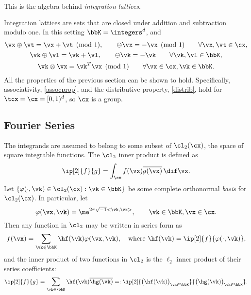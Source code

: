 \documentclass[]{elsarticle}
\theoremstyle{definition}
\theoremstyle{remark}
\begin{document}
This is the algebra behind \emph{integration lattices}.

Integration lattices are sets that are closed under addition and subtraction modulo one.  In this setting $\bbK=\integers^d$, and
\begin{gather*}
\vx \oplus \vt = \vx + \vt \pmod 1, \qquad \ominus \vx = -\vx \pmod 1 \qquad \forall \vx, \vt \in \cx, \\
\vk \oplus \vl = \vk + \vl, \qquad \ominus \vk = -\vk \qquad \forall \vk, \vl \in \bbK, \\
\vk \otimes \vx = \vk^T \vx \pmod 1 \qquad \forall \vx \in \cx, \vk \in \bbK.
\end{gather*}
All the properties of the previous section can be shown to hold.  Specifically, associativity, \eqref{assocprop}, and the distributive property, \eqref{distrib}, hold for $\tcx = \cx=[0,1)^d$, so $\cx$ is a group.

\subsection{Fourier Series}

The integrands are assumed to belong to some subset of $\cl_2(\cx)$, the space of square integrable functions.  The $\cl_2$ inner product is defined as
\[
\ip[2]{f}{g} = \int_{\cx} f(\vx) \overline{g(\vx)} \, \dif \vx.
\]
Let $\{\varphi(\cdot,\vk) \in \cl_2(\cx) : \vk \in \bbK\}$ be some complete orthonormal \emph{basis} for $\cl_2(\cx)$. In particular, let
\[
\varphi(\vx,\vk)  = \me^{2 \pi \sqrt{-1} <\vk,\vx>}, \qquad \vk \in \bbK, \vx \in \cx.
\]
Then any function in $\cl_2$ may be written in series form as
\begin{equation} \label{Fourierdef}
f(\vx) = \sum_{\vk \in \bbK} \hf(\vk) \varphi(\vx,\vk), \quad \text{where } \hf(\vk) = \ip[2]{f}{\varphi(\cdot,\vk)},
\end{equation}
and the inner product of two functions in $\cl_2$ is the $\ell_2$ inner product of their series coefficients:
\[
\ip[2]{f}{g} = \sum_{\vk \in \bbK} \hf(\vk)\overline{\hg(\vk)} =: \ip[2]{\bigl(\hf(\vk)\bigr)_{\vk \in \bbK}}{\bigl ( \hg(\vk)\bigr )_{\vk \in \bbK}}.
\]
\end{document}

